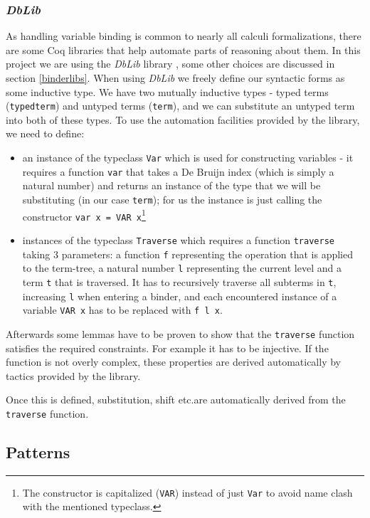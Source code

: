 \documentclass[runningheads]{article}
\begin{document}
\subsubsection{\textit{DbLib}}

As handling variable binding is common to nearly all calculi formalizations, there are some Coq libraries that help automate parts of reasoning about them. In this project we are using the \textit{DbLib} library \cite{dblib}, some other choices are discussed in section \ref{binderlibs}.
\label{traverse}
When using \textit{DbLib} we freely define our syntactic forms as some inductive type. We have two mutually inductive types - typed terms (\texttt{typedterm}) and untyped terms (\texttt{term}), and we can substitute an untyped term into both of these types. To use the automation facilities provided by the library, we need to define:
\begin{itemize}
  \item an instance of the typeclass \texttt{Var} which is used for constructing variables - it requires a function \texttt{var} that takes a De Bruijn index (which is simply a natural number) and returns an instance of the type that we will be substituting (in our case \texttt{term}); for us the instance is just calling the constructor \texttt{var x = VAR x}\footnote{The constructor is capitalized (\texttt{VAR}) instead of just \texttt{Var} to avoid name clash with the mentioned typeclass.}
  \item instances of the typeclass \texttt{Traverse} which requires a function \texttt{traverse} taking 3 parameters: a function \texttt{f} representing the operation that is applied to the term-tree, a natural number \texttt{l} representing the current level and a term \texttt{t} that is traversed. It has to recursively traverse all subterms in \texttt{t}, increasing \texttt{l} when entering a binder, and each encountered instance of a variable \texttt{VAR x} has to be replaced with \texttt{f l x}.
\end{itemize}
Afterwards some lemmas have to be proven to show that the \texttt{traverse} function satisfies the required constraints. For example it has to be injective. If the function is not overly complex, these properties are derived automatically by tactics provided by the library.

Once this is defined, substitution, shift etc.\@ are automatically derived from the \texttt{traverse} function.

\subsection{Patterns}
\end{document}
